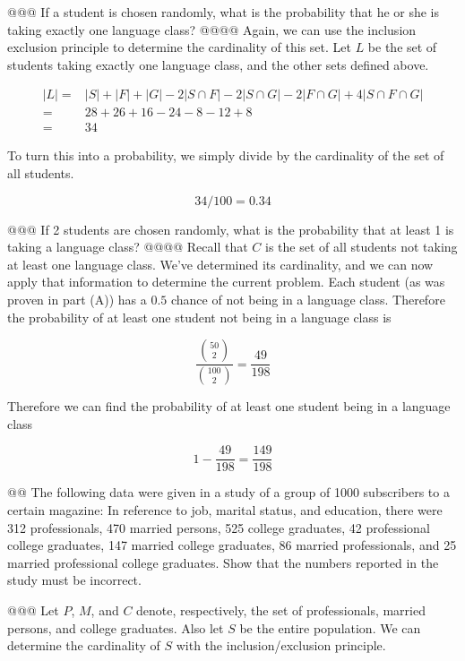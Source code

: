 \documentclass[10pt]{article}
\begin{document}
\begin{easylist}[enumerate]
    @@@ If a student is chosen randomly, what is the probability that he or she is taking exactly one language class?
    @@@@ Again, we can use the inclusion exclusion principle to determine the cardinality of this set. Let $L$ be the set of students taking exactly one language class, and the other sets defined above.

        \[ \begin{aligned}
            |L| =& |S| + |F| + |G| - 2|S \cap F| - 2|S \cap G| - 2|F \cap G| + 4|S \cap F \cap G|\\
                =& 28 + 26 + 16 - 24 - 8 - 12 + 8\\
                =& 34
        \end{aligned} \]

        To turn this into a probability, we simply divide by the cardinality of the set of all students.

        \[ 34/100 = \boxed{0.34} \]

    @@@ If 2 students are chosen randomly, what is the probability that at least 1 is taking a language class?
    @@@@ Recall that $C$ is the set of all students not taking at least one language class. We've determined its cardinality, and we can now apply that information to determine the current problem. Each student (as was proven in part (A)) has a $0.5$ chance of not being in a language class. Therefore the probability of at least one student not being in a language class is

        \[ \frac{\binom{50}{2}}{\binom{100}{2}} = \frac{49}{198} \]

    Therefore we can find the probability of at least one student being in a language class

        \[ 1 - \frac{49}{198} = \boxed{\frac{149}{198}} \]

    @@ The following data were given in a study of a group of 1000 subscribers to a certain magazine: In reference to job, marital status, and education, there were 312 professionals, 470 married persons, 525 college graduates, 42 professional college graduates, 147 married college graduates, 86 married professionals, and 25 married professional college graduates. Show that the numbers reported in the study must be incorrect.\newline

    @@@ Let $P$, $M$, and $C$ denote, respectively, the set of professionals, married persons, and college graduates. Also let $S$ be the entire population. We can determine the cardinality of $S$ with the inclusion/exclusion principle.


\end{easylist}
\end{document}
